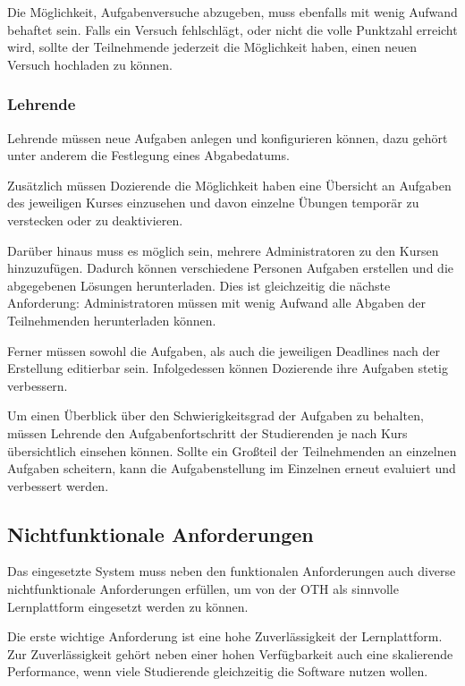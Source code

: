 Die Möglichkeit, Aufgabenversuche abzugeben, muss ebenfalls mit wenig Aufwand
behaftet sein. Falls ein Versuch fehlschlägt, oder nicht die volle Punktzahl
erreicht wird, sollte der Teilnehmende jederzeit die Möglichkeit haben, einen
neuen Versuch hochladen zu können.

\subsubsection{Lehrende}\label{anforderungsanalyse-funktional-lehrende}
Lehrende müssen neue Aufgaben anlegen und konfigurieren können, dazu gehört
unter anderem die Festlegung eines Abgabedatums.

Zusätzlich müssen Dozierende die Möglichkeit haben eine Übersicht an Aufgaben
des jeweiligen Kurses einzusehen und davon einzelne Übungen temporär zu
verstecken oder zu deaktivieren.

Darüber hinaus muss es möglich sein, mehrere Administratoren zu den Kursen
hinzuzufügen. Dadurch können verschiedene Personen Aufgaben erstellen und die
abgegebenen Lösungen herunterladen. Dies ist gleichzeitig die nächste
Anforderung: Administratoren müssen mit wenig Aufwand alle Abgaben der
Teilnehmenden herunterladen können.

Ferner müssen sowohl die Aufgaben, als auch die jeweiligen Deadlines nach der
Erstellung editierbar sein. Infolgedessen können Dozierende ihre Aufgaben stetig
verbessern.

Um einen Überblick über den Schwierigkeitsgrad der Aufgaben zu behalten, müssen
Lehrende den Aufgabenfortschritt der Studierenden je nach Kurs übersichtlich
einsehen können. Sollte ein Großteil der Teilnehmenden an einzelnen Aufgaben
scheitern, kann die Aufgabenstellung im Einzelnen erneut evaluiert und
verbessert werden.

\newpage

\subsection{Nichtfunktionale Anforderungen}
\label{anforderungsanalyse-nichtfunktional}
Das eingesetzte System muss neben den funktionalen Anforderungen auch diverse
nichtfunktionale Anforderungen erfüllen, um von der OTH als sinnvolle
Lernplattform eingesetzt werden zu können.

Die erste wichtige Anforderung ist eine hohe Zuverlässigkeit der Lernplattform.
Zur Zuverlässigkeit gehört neben einer hohen Verfügbarkeit auch eine skalierende
Performance, wenn viele Studierende gleichzeitig die Software nutzen wollen.

